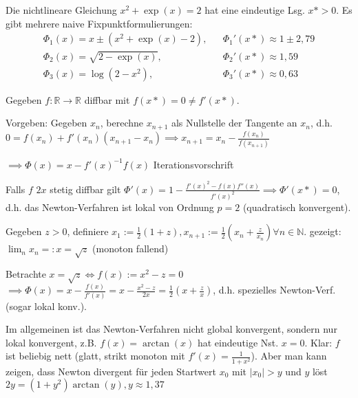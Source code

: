 \begin{example}
	Die nichtlineare Gleichung $x^2 + \exp(x) = 2$ hat eine eindeutige Lsg. $x* > 0$. Es gibt mehrere naive Fixpunktformulierungen:
	\begin{align*}
		\Phi_1(x) = x \pm (x^2 + \exp(x) - 2), && \Phi_1'(x*) \approx 1 \pm 2,79\\
		\Phi_2(x) = \sqrt{2 - \exp(x)}, && \Phi_2'(x*) \approx 1,59\\
		\Phi_3(x) = \log(2-x^2), && \Phi_3'(x*) \approx 0,63
	\end{align*}
\end{example}

\begin{example}
	Gegeben $f: \mathbb{R} \rightarrow \mathbb{R}$ diffbar mit $f(x*) = 0 \neq f'(x*)$.
	
	Vorgeben: Gegeben $x_n$, berechne $x_{n+1}$ als Nullstelle der Tangente an $x_n$, d.h. $0 = f(x_n) + f'(x_n)(x_{n+1}-x_n) \implies x_{n+1} = x_n - \frac{f(x_n)}{f(x_{n+1})}$
	
	$\implies \Phi(x) = x - f'(x)^{-1}f(x)$ Iterationsvorschrift
	
	Falls $f$ $2x$ stetig diffbar gilt $\Phi'(x) = 1- \frac{f'(x)^2 - f(x) f''(x)}{f'(x)^2} \implies \Phi'(x*) = 0$, d.h. das Newton-Verfahren ist lokal von Ordnung $p=2$ (quadratisch konvergent).
\end{example}

\begin{example}
	Gegeben $z>0$, definiere $x_1 := \frac{1}{2}(1+z), x_{n+1} := \frac{1}{2}(x_n + \frac{z}{x_n}) \forall n \in \mathbb{N}$. gezeigt: $\lim_n x_n =: x = \sqrt{z}$ (monoton fallend)
	
	Betrachte $x = \sqrt{z} \iff f(x) := x^2 - z = 0$ $\implies \Phi(x) = x - \frac{f(x)}{f'(x)} = x - \frac{x^2-z}{2x} = \frac{1}{2}(x + \frac{z}{x})$, d.h. spezielles Newton-Verf. (sogar lokal konv.).
\end{example}

\begin{remark}
	Im allgemeinen ist das Newton-Verfahren nicht global konvergent, sondern nur lokal konvergent, z.B. $f(x) = \arctan(x)$ hat eindeutige Nst. $x=0$. Klar: $f$ ist beliebig nett (glatt, strikt monoton mit $f'(x) = \frac{1}{1+x^2}$). Aber man kann zeigen, dass Newton divergent für jeden Startwert $x_0$ mit $|x_0| > y$ und $y$ löst $2y = (1+y^2)\arctan(y), y\approx 1,37$
\end{remark}

